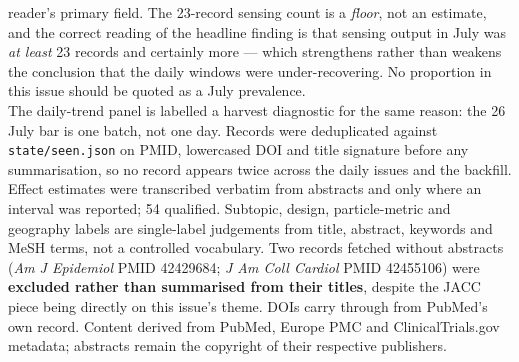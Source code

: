 \documentclass[10pt]{article}
\begin{document}
\begin{keybox}
{reader's primary field. The 23-record sensing count is a \emph{floor}, not an estimate,
and the correct reading of the headline finding is that sensing output in July was
\emph{at least} 23 records and certainly more --- which strengthens rather than weakens
the conclusion that the daily windows were under-recovering. No proportion in this issue
should be quoted as a July prevalence.
\\[1.0mm]
The daily-trend panel is labelled a harvest diagnostic for the same reason: the 26 July
bar is one batch, not one day. Records were deduplicated against
\texttt{state/seen.json} on PMID, lowercased DOI and title signature before any
summarisation, so no record appears twice across the daily issues and the backfill.
Effect estimates were transcribed verbatim from abstracts and only where an interval was
reported; 54 qualified. Subtopic, design, particle-metric and geography labels are
single-label judgements from title, abstract, keywords and MeSH terms, not a controlled
vocabulary. Two records fetched without abstracts (\textit{Am J Epidemiol} PMID 42429684;
\textit{J Am Coll Cardiol} PMID 42455106) were \textbf{excluded rather than summarised
from their titles}, despite the JACC piece being directly on this issue's theme. DOIs
carry through from PubMed's own record. Content derived from PubMed, Europe PMC and
ClinicalTrials.gov metadata; abstracts remain the copyright of their respective
publishers.\par}
\end{keybox}
\end{document}
